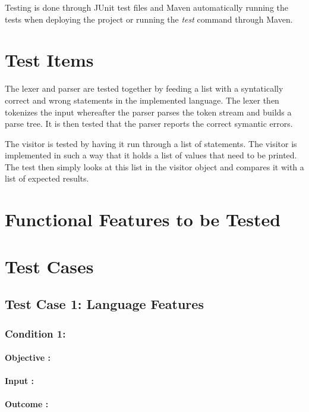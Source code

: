 \documentclass[english]{article}
\begin{document}
			Testing is done through JUnit test files and Maven automatically running the tests when deploying the project or running the \textit{test} command through Maven.
		\section{Test Items}
			The lexer and parser are tested together by feeding a list with a syntatically correct and wrong statements in the implemented language. The lexer then tokenizes the input whereafter the parser parses the token stream and builds a parse tree. It is then tested that the parser reports the correct symantic errors.
			
			The visitor is tested by having it run through a list of statements. The visitor is implemented in such a way that it holds a list of values that need to be printed. The test then simply looks at this list in the visitor object and compares it with a list of expected results.
		
	\section{Functional Features to be Tested}
		\section{Test Cases}

			\subsection{Test Case 1: Language Features}
			\subsubsection{Condition 1: }
			\paragraph{Objective :}
			\paragraph{Input :}
			\paragraph{Outcome :}
		
\end{document}
